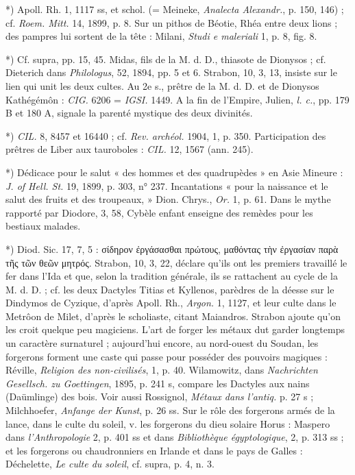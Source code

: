 \documentclass[a4paper, 11pt, oneside, polutonikogreek, french]{article}
\begin{document}
*) Apoll. Rh. 1, 1117 ss, et schol. (= Meineke, \emph{Analecta Alexandr.}, p. 150, 146) ; cf. \emph{Roem. Mitt.} 14, 1899, p. 8. Sur un pithos de Béotie, Rhéa entre deux lions ; des pampres lui sortent de la tête : Milani, \emph{Studi e maleriali} 1, p. 8, fig. 8.

*) Cf. supra, pp. 15, 45. Midas, fils de la M. d. D., thiasote de Dionysos ; cf. Dieterich dans \emph{Philologus}, 52, 1894, pp. 5 et 6. Strabon, 10, 3, 13, insiste sur le lien qui unit les deux cultes. Au 2e s., prêtre de la M. d. D. et de Dionysos Kathégémôn : \emph{CIG.} 6206 = \emph{IGSI.} 1449. A la fin de l'Empire, Julien, \emph{l. c.}, pp. 179 B et 180 A, signale la parenté mystique des deux divinités.

*) \emph{CIL.} 8, 8457 et 16440 ; cf. \emph{Rev. archéol.} 1904, 1, p. 350. Participation des prêtres de Liber aux tauroboles : \emph{CIL.} 12, 1567 (ann. 245).

*) Dédicace pour le salut « des hommes et des quadrupèdes » en Asie Mineure : \emph{J. of Hell. St.} 19, 1899, p. 303, n° 237. Incantations « pour la naissance et le salut des fruits et des troupeaux, » Dion. Chrys., \emph{Or.} 1, p. 61. Dans le mythe rapporté par Diodore, 3, 58, Cybèle enfant enseigne des remèdes pour les bestiaux malades.

*) Diod. Sic. 17, 7, 5 : σίδηρον ἐργάσασθαι πρώτους, μαθόντας τὴν ἐργασίαν παρὰ τῆς τῶν θεῶν μητρός. Strabon, 10, 3, 22, déclare qu'ils ont les premiers travaillé le fer dans l'Ida et que, selon la tradition générale, ils se rattachent au cycle de la M. d. D. ; cf. les deux Dactyles Titias et Kyllenos, parèdres de la déesse sur le Dindymos de Cyzique, d'après Apoll. Rh., \emph{Argon.} 1, 1127, et leur culte dans le Metrôon de Milet, d'après le scholiaste, citant Maiandros. Strabon ajoute qu'on les croit quelque peu magiciens. L'art de forger les métaux dut garder longtemps un caractère surnaturel ; aujourd'hui encore, au nord-ouest du Soudan, les forgerons forment une caste qui passe pour posséder des pouvoirs magiques : Réville, \emph{Religion des non-civilisés}, 1, p. 40. Wilamowitz, dans \emph{Nachrichten Gesellsch. zu Goettingen}, 1895, p. 241 s, compare les Dactyles aux nains (Daümlinge) des bois. Voir aussi Rossignol, \emph{Métaux dans l'antiq.} p. 27 s ; Milchhoefer, \emph{Anfange der Kunst}, p. 26 ss. Sur le rôle des forgerons armés de la lance, dans le culte du soleil, v. les forgerons du dieu solaire Horus : Maspero dans \emph{l'Anthropologie} 2, p. 401 ss et dans \emph{Bibliothèque égyptologique}, 2, p. 313 ss ; et les forgerons ou chaudronniers en Irlande et dans le pays de Galles : Déchelette, \emph{Le culte du soleil}, cf. supra, p. 4, n. 3.
\end{document}
